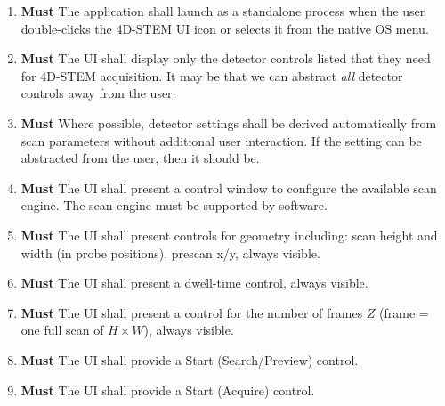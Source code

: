 \documentclass[10pt]{article}
\newcommand{\PriorityTag}[2]{%
    \colorbox{#2!25}{\footnotesize\textsf{\textbf{#1}}}\hspace{0.6em}}
\newcommand{\must}{\leavevmode\PriorityTag{Must}{green}}
\newcounter{reqgrp}[section] %
\newcounter{reqno}
\newcommand{\reqprefix}{GEN}
\newenvironment{requirements}[1]{%
    \renewcommand{\reqprefix}{#1}%
    \refstepcounter{reqgrp}%
    \setcounter{reqno}{0}%
    \begin{enumerate}[leftmargin=*]
    }{\end{enumerate}}
\begin{document}
    \begin{requirements}{UI}

        \item \must {}
        {The application shall launch as a standalone process when the user double-clicks the 4D-STEM UI icon or selects it from the native OS menu.}

        \item \must {}
        {The UI shall display only the detector controls listed that they need for 4D-STEM acquisition. It may be that we can abstract \textit{all} detector controls away from the user.}

        \item \must {}
        { Where possible, detector settings shall be derived automatically from scan parameters without additional user interaction. If the setting can be abstracted from the user, then it should be.}

        \item \must {}
        {The UI shall present a control window to configure the available scan engine. The scan engine must be supported by software.}

        \item \must {}
        {The UI shall present controls for geometry including: scan height and width (in probe positions), prescan x/y, always visible.}

        \item \must {}
        {The UI shall present a dwell-time control, always visible.}

        \item \must {}
        {The UI shall present a control for the number of frames \(Z\) (frame = one full scan of \(H\times W\)), always visible.}

        \item \must {}
        {The UI shall provide a Start (Search/Preview) control.}

        \item \must {}
        {The UI shall provide a Start (Acquire) control.}


\end{requirements}
\end{document}
